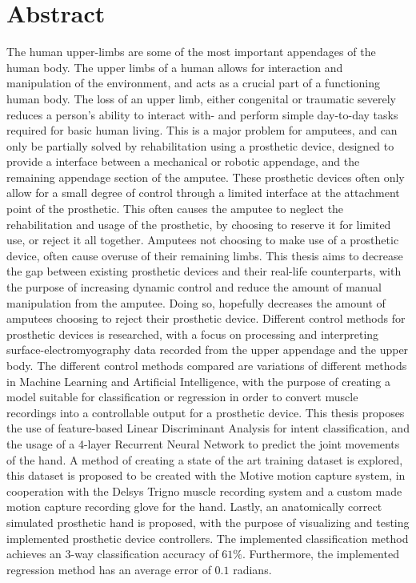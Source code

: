 \documentclass[../main.tex]{subfiles}
\begin{document}
\section*{Abstract}

The human upper-limbs are some of the most important appendages of the human body.
The upper limbs of a human allows for interaction and manipulation of the environment, and acts as a crucial part of a functioning human body.
The loss of an upper limb, either congenital or traumatic severely reduces a person's ability to interact with- and perform simple day-to-day tasks
required for basic human living.
This is a major problem for amputees, and can only be partially solved by rehabilitation using a prosthetic device, designed to provide a interface between a mechanical or robotic appendage, and the remaining appendage section of the amputee.
These prosthetic devices often only allow for a small degree of control through a limited interface at the attachment point of the prosthetic.
This often causes the amputee to neglect the rehabilitation and usage of the prosthetic, by choosing to reserve it for limited use, or reject it all together.
Amputees not choosing to make use of a prosthetic device, often cause overuse of their remaining limbs.
This thesis aims to decrease the gap between existing prosthetic devices and their real-life counterparts, with the purpose of increasing dynamic control and reduce the amount of manual manipulation from the amputee.
Doing so, hopefully decreases the amount of amputees choosing to reject their prosthetic device. 
Different control methods for prosthetic devices is researched, with a focus on processing and interpreting surface-electromyography data recorded from the upper appendage and the upper body.
The different control methods compared are variations of different methods in Machine Learning and Artificial Intelligence, with the purpose of creating a model suitable for classification or regression in order to convert muscle recordings into a controllable output for a prosthetic device.
This thesis proposes the use of feature-based Linear Discriminant Analysis for intent classification, and the usage of a 4-layer Recurrent Neural Network to predict the joint movements of the hand.
A method of creating a state of the art training dataset is explored, this dataset is proposed to be created with the Motive motion capture system, in cooperation with the Delsys Trigno muscle recording system and a custom made motion capture recording glove for the
hand.
Lastly, an anatomically correct simulated prosthetic hand is proposed, with the purpose of visualizing and testing implemented prosthetic device controllers.
The implemented classification method achieves an 3-way classification accuracy of $61\%$.
Furthermore, the implemented regression method has an average error of $0.1$ radians.

\end{document}

